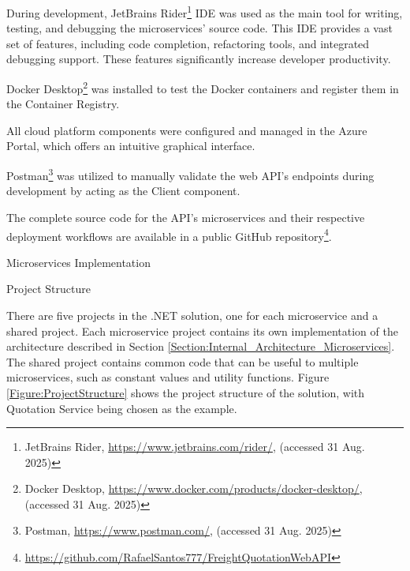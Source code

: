 \documentclass[12pt, reqno, oneside]{amsbook}
\makeatletter
\def\section{\@startsection{section}{1}%
      \z@{.5\linespacing\@plus.7\linespacing}{.25\linespacing}%
      {\normalfont\bfseries\flushleft}}
\def\subsection{\@startsection{subsection}{2}%
      \z@{.5\linespacing\@plus.7\linespacing}{.25\linespacing}%
      {\normalfont\bfseries\flushleft}}
\theoremstyle{definition}
\theoremstyle{definition}
\numberwithin{section}{chapter}
\numberwithin{table}{chapter}
\numberwithin{figure}{chapter}
\makeatother
\begin{document}
During development, JetBrains Rider\footnote{JetBrains Rider, \url{https://www.jetbrains.com/rider/}, (accessed 31 Aug. 2025)} \ac{IDE} was used as the main tool for writing, testing, and debugging the microservices' source code. This \ac{IDE} provides a vast set of features, including code completion, refactoring tools, and integrated debugging support. These features significantly increase developer productivity.

Docker Desktop\footnote{Docker Desktop, \url{https://www.docker.com/products/docker-desktop/}, (accessed 31 Aug. 2025)} was installed to test the Docker containers and register them in the Container Registry.

All cloud platform components were configured and managed in the Azure Portal, which offers an intuitive graphical interface.

Postman\footnote{Postman, \url{https://www.postman.com/}, (accessed 31 Aug. 2025)} was utilized to manually validate the web \ac{API}'s endpoints during development by acting as the Client component.

The complete source code for the \ac{API}'s microservices and their respective deployment workflows are available in a public GitHub repository\footnote{\url{https://github.com/RafaelSantos777/FreightQuotationWebAPI}}.

\pagebreak

\section{Microservices Implementation}
\label{Section:Microservices_Implementation}

\subsection{Project Structure}

There are five projects in the .NET solution, one for each microservice and a shared project. Each microservice project contains its own implementation of the architecture described in Section \ref{Section:Internal_Architecture_Microservices}. The shared project contains common code that can be useful to multiple microservices, such as constant values and utility functions.
Figure \ref{Figure:ProjectStructure} shows the project structure of the solution, with Quotation Service being chosen as the example.
\end{document}

